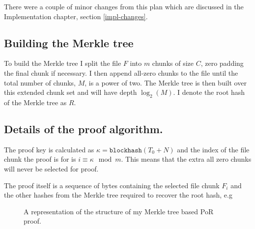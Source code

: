 \documentclass[12pt,a4paper,twoside,openright]{report}
\begin{document}
There were a couple of minor changes from this plan which are discussed in the Implementation chapter, section \ref{impl-changes}.

%
%
%


\subsection{Building the Merkle tree}

To build the Merkle tree I split the file $F$ into $m$ chunks of size $C$, zero padding the final chunk if necessary.
I then append all-zero chunks to the file until the total number of chunks, $M$, is a power of two.
The Merkle tree is then built over this extended chunk set and will have depth $\log_2(M)$.
I denote the root hash of the Merkle tree as $R$.


\subsection{Details of the proof algorithm.}
\label{proof-details}

The proof key is calculated as $\kappa = \texttt{blockhash}(T_0 + N)$
and the index of the file chunk the proof is for is $i \equiv \kappa \mod m$.
This means that the extra all zero chunks will never be selected for proof.

The proof itself is a sequence of bytes containing the selected file chunk $F_i$ and the other hashes from the Merkle tree required to recover the root hash, e.g


\begin{figure}[h]
\caption[Proof structure]{A representation of the structure of my Merkle tree based PoR proof.}
\end{figure}
\end{document}
